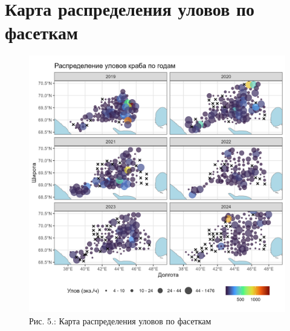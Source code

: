 \documentclass[
  letterpaper,
  DIV=11,
  numbers=noendperiod]{scrreprt}
\begin{document}
\section{Карта распределения уловов по
фасеткам}\label{ux43aux430ux440ux442ux430-ux440ux430ux441ux43fux440ux435ux434ux435ux43bux435ux43dux438ux44f-ux443ux43bux43eux432ux43eux432-ux43fux43e-ux444ux430ux441ux435ux442ux43aux430ux43c}

\begin{figure}[H]

{\centering \includegraphics[width=0.8\linewidth,height=\textheight,keepaspectratio]{images/KARTOGRAPH5.jpg}

}

\caption{Рис. 5.: Карта распределения уловов по фасеткам}

\end{figure}%
\end{document}
